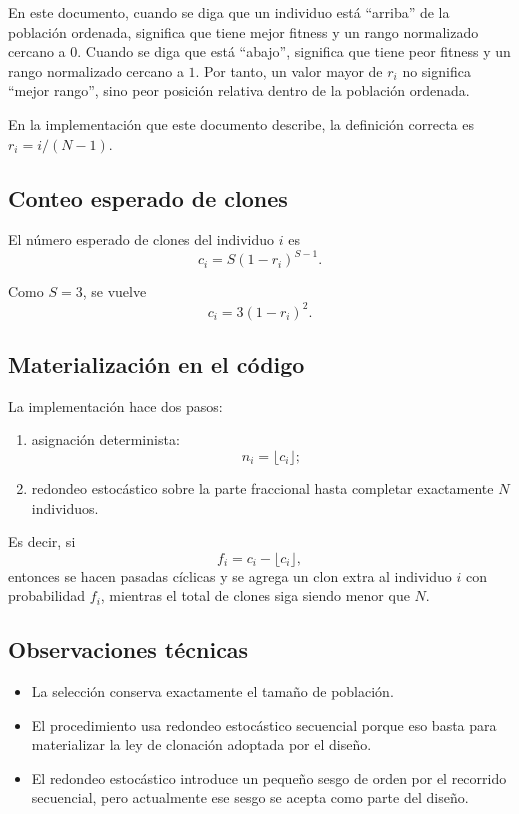 \documentclass[11pt]{article}
\begin{document}
En este documento, cuando se diga que un individuo est\'a ``arriba'' de la
poblaci\'on ordenada, significa que tiene mejor fitness y un rango normalizado
cercano a \(0\). Cuando se diga que est\'a ``abajo'', significa que tiene peor
fitness y un rango normalizado cercano a \(1\). Por tanto, un valor mayor de
\(r_i\) no significa ``mejor rango'', sino peor posici\'on relativa dentro de la
poblaci\'on ordenada.

En la implementaci\'on que este documento describe, la definici\'on correcta es
\(r_i = i/(N-1)\).

\subsection{Conteo esperado de clones}

El n\'umero esperado de clones del individuo \(i\) es
\[
c_i = S(1-r_i)^{S-1}.
\]

Como \(S=3\), se vuelve
\[
c_i = 3(1-r_i)^2.
\]

\subsection{Materializaci\'on en el c\'odigo}

La implementaci\'on hace dos pasos:

\begin{enumerate}
  \item asignaci\'on determinista:
  \[
  n_i = \lfloor c_i \rfloor;
  \]
  \item redondeo estoc\'astico sobre la parte fraccional hasta completar
  exactamente \(N\) individuos.
\end{enumerate}

Es decir, si
\[
f_i = c_i - \lfloor c_i \rfloor,
\]
entonces se hacen pasadas c\'iclicas y se agrega un clon extra al individuo
\(i\) con probabilidad \(f_i\), mientras el total de clones siga siendo menor
que \(N\).

\subsection{Observaciones t\'ecnicas}

\begin{itemize}
  \item La selecci\'on conserva exactamente el tama\~no de poblaci\'on.
  \item El procedimiento usa redondeo estoc\'astico secuencial porque eso basta
  para materializar la ley de clonaci\'on adoptada por el dise\~no.
  \item El redondeo estoc\'astico introduce un peque\~no sesgo de orden por el
  recorrido secuencial, pero actualmente ese sesgo se acepta como parte del
  dise\~no.
\end{itemize}
\end{document}
